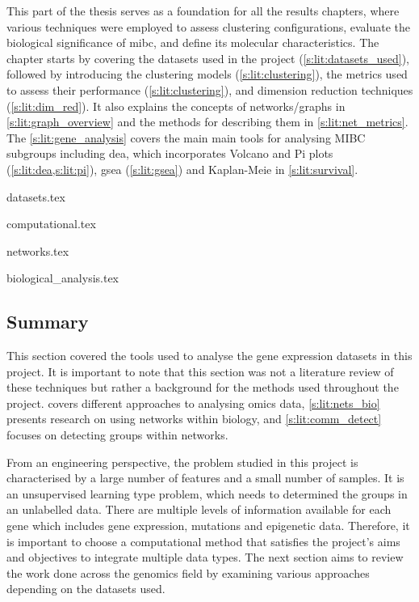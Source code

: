 This part of the thesis serves as a foundation for all the results chapters, where various techniques were employed to assess clustering configurations, evaluate the biological significance of \acrshort{mibc}, and define its molecular characteristics. The chapter starts by covering the datasets used in the project (\cref{s:lit:datasets_used}), followed by introducing the clustering models (\cref{s:lit:clustering}), the metrics used to assess their performance (\cref{s:lit:clustering}), and dimension reduction techniques (\cref{s:lit:dim_red}). It also explains the concepts of networks/graphs in \cref{s:lit:graph_overview} and the methods for describing them in \cref{s:lit:net_metrics}. The \cref{s:lit:gene_analysis} covers the main main tools for analysing MIBC subgroups including \acrfull{dea}, which incorporates Volcano and Pi plots (\cref{s:lit:dea,s:lit:pi}), \acrfull{gsea} (\cref{s:lit:gsea}) and Kaplan-Meie in \cref{s:lit:survival}.



{datasets.tex}

{computational.tex}

{networks.tex}

{biological_analysis.tex}



\subsection{Summary} \label{s:lit:choosing_ml}


This section covered the tools used to analyse the gene expression datasets in this project. It is important to note that this section was not a literature review of these techniques but rather a background for the methods used throughout the project.  covers different approaches to analysing omics data, \cref{s:lit:nets_bio} presents research on using networks within biology, and \cref{s:lit:comm_detect} focuses on detecting groups within networks.

From an engineering perspective, the problem studied in this project is characterised by a large number of features and a small number of samples. It is an unsupervised learning type problem, which needs to determined the groups in an unlabelled data. There are multiple levels of information available for each gene which includes gene expression, mutations and epigenetic data. Therefore, it is important to choose a computational method that satisfies the project's aims and objectives to integrate multiple data types. The next section aims to review the work done across the genomics field by examining various approaches depending on the datasets used.
